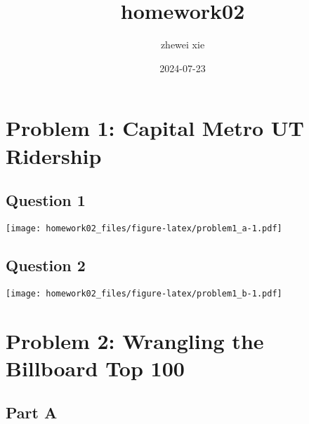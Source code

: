 \documentclass[
]{article}
\title{homework02}
\author{zhewei xie}
\date{2024-07-23}
\begin{document}
\maketitle

\hypertarget{problem-1-capital-metro-ut-ridership}{%
\section{Problem 1: Capital Metro UT
Ridership}\label{problem-1-capital-metro-ut-ridership}}

\hypertarget{question-1}{%
\subsection{Question 1}\label{question-1}}

\texttt{[image: homework02\_files/figure-latex/problem1\_a-1.pdf]}

\hypertarget{question-2}{%
\subsection{Question 2}\label{question-2}}

\texttt{[image: homework02\_files/figure-latex/problem1\_b-1.pdf]}

\newpage

\hypertarget{problem-2-wrangling-the-billboard-top-100}{%
\section{Problem 2: Wrangling the Billboard Top
100}\label{problem-2-wrangling-the-billboard-top-100}}

\hypertarget{part-a}{%
\subsection{Part A}\label{part-a}}
\end{document}
